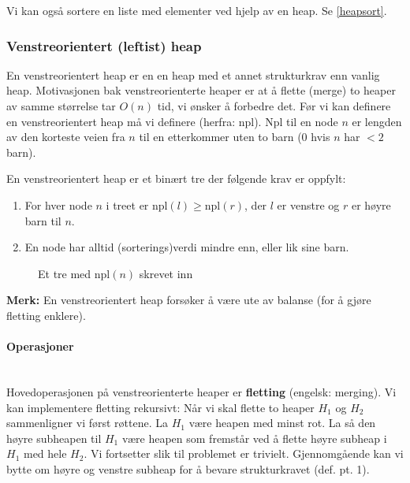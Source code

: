 Vi kan også sortere en liste med elementer ved hjelp av en heap. Se \ref{heapsort}.



\subsubsection{Venstreorientert (leftist) heap}
En venstreorientert heap er en en heap med et annet strukturkrav enn vanlig heap. Motivasjonen bak venstreorienterte heaper er at å flette (merge) to heaper av samme størrelse tar $ O(n) $ tid, vi ønsker å forbedre det. Før vi kan definere en venstreorientert heap må vi definere  (herfra: npl). Npl til en node $ n $ er lengden av den korteste veien fra $ n $ til en etterkommer uten to barn ($ 0 $ hvis $ n $ har $ <2 $ barn). 

\begin{definition} En venstreorientert heap er et binært tre der følgende krav er oppfylt:
\begin{enumerate}
\item For hver node $ n $ i treet er $ \text{npl}(l) \geq \text{npl}(r) $, der $ l $ er venstre og $ r $ er høyre barn til $ n $.
\item En node har alltid (sorterings)verdi mindre enn, eller lik sine barn. 
\end{enumerate}
\end{definition}

\begin{figure}[H]
\centering
\caption{Et tre med $ \text{npl}(n) $ skrevet inn}
\end{figure}

\noindent \textbf{Merk:} En venstreorientert heap forsøker å være ute av balanse (for å gjøre fletting enklere).

\paragraph{Operasjoner}~\\
Hovedoperasjonen på venstreorienterte heaper er \textbf{fletting} (engelsk: merging). Vi kan implementere fletting rekursivt: Når vi skal flette to heaper $ H_1 $ og $ H_2 $ sammenligner vi først røttene. La $ H_1 $ være heapen med minst rot. La så den høyre subheapen til $ H_1 $ være heapen som fremstår ved å flette høyre subheap i $ H_1 $ med hele $ H_2 $. Vi fortsetter slik til problemet er trivielt. Gjennomgående kan vi bytte om høyre og venstre subheap for å bevare strukturkravet (def. pt. 1).

